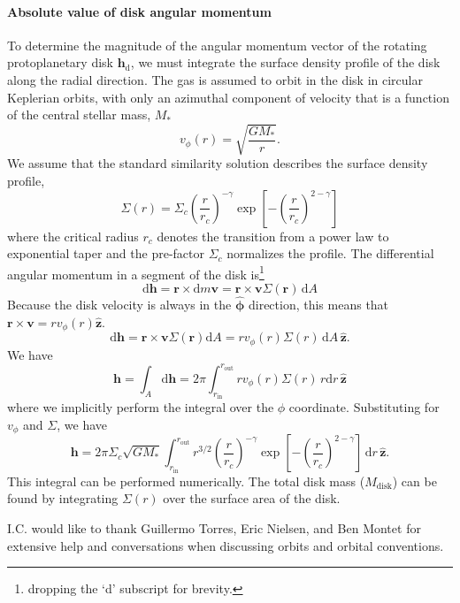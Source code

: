 \documentclass[modern]{aastex61}
\begin{document}
\paragraph{Absolute value of disk angular momentum}
To determine the magnitude of the angular momentum vector of the rotating protoplanetary disk ${\bm h}_\mathrm{d}$, we must integrate the surface density profile of the disk along the radial direction. The gas is assumed to orbit in the disk in circular Keplerian orbits, with only an azimuthal component of velocity that is a function of the central stellar mass, $M_\ast$
\begin{equation}
	v_\phi(r) = \sqrt{\frac{G M_\ast}{r}}.
\end{equation}
We assume that the standard \citet{lynden-bell74} similarity solution describes the surface density profile,
\begin{equation}
\Sigma(r) = \Sigma_c \left (\frac{r}{r_c} \right)^{- \gamma} \exp \left[ - \left(\frac{r}{r_c} \right)^{2 - \gamma} \right]
\end{equation}
 where the critical radius $r_c$ denotes the transition from a power law to exponential taper and the pre-factor $\Sigma_c$ normalizes the profile. 
The differential angular momentum in a segment of the disk is\footnote{dropping the `d' subscript for brevity.}
\begin{equation}
\mathrm{d}{\bm h} = {\bm r} \times \mathrm{d}m {\bm v} = {\bm r} \times {\bm v} \Sigma({\bm r}) \, \mathrm{d}A  
\end{equation}
Because the disk velocity is always in the $\hat{{\bm \phi}}$ direction, this means that ${\bm r} \times {\bm v} = rv_\phi(r) \hat{{\bm z}}$.
\begin{equation}
\mathrm{d}{\bm h} = {\bm r} \times {\bm v} \Sigma({\bm r}) \mathrm{d}A = r v_\phi(r) \Sigma(r) \, \mathrm{d}A \, \hat{{\bm z}}.
\end{equation}
We have
\begin{equation}
{\bm h} = \int_A \mathrm{d}{\bm h} = 2 \pi \int_{r_\mathrm{in}}^{r_\mathrm{out}} r v_\phi(r) \Sigma(r) \, r \mathrm{d}r \, \hat{{\bm z}}
\end{equation}
where we implicitly perform the integral over the $\phi$ coordinate. Substituting for $v_\phi$ and $\Sigma$, we have
\begin{equation}
{\bm h} =  2 \pi \Sigma_c \sqrt{G M_\ast} \int_{r_\mathrm{in}}^{r_\mathrm{out}} r^{3/2} \left (\frac{r}{r_c} \right)^{- \gamma} \exp \left[ - \left(\frac{r}{r_c} \right)^{2 - \gamma} \right] \, \mathrm{d}r \, \hat{{\bm z}}.
\end{equation}
This integral can be performed numerically.
The total disk mass ($M_\mathrm{disk}$) can be found by integrating $\Sigma(r)$ over the surface area of the disk. 


\vspace{5mm}

\acknowledgements
I.C. would like to thank Guillermo Torres, Eric Nielsen, and Ben Montet for extensive help and conversations when discussing orbits and orbital conventions.



\end{document}
